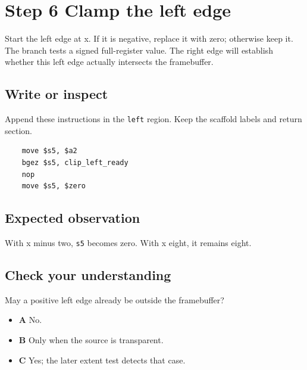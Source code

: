 \section{Step 6 Clamp the left edge}\label{blit-s06}

Start the left edge at x. If it is negative, replace it with zero; otherwise keep it. The branch tests a signed full-register value. The right edge will establish whether this left edge actually intersects the framebuffer.

\subsection{Write or inspect}
Append these instructions in the \texttt{left} region. Keep the scaffold labels and return section.

\begin{verbatim}
    move $s5, $a2
    bgez $s5, clip_left_ready
    nop
    move $s5, $zero
\end{verbatim}

\subsection{Expected observation}
With x minus two, \texttt{s5} becomes zero. With x eight, it remains eight.

\subsection{Check your understanding}
May a positive left edge already be outside the framebuffer?

\begin{itemize}
  \item \textbf{A} No.
  \item \textbf{B} Only when the source is transparent.
  \item \textbf{C} Yes; the later extent test detects that case.
\end{itemize}

